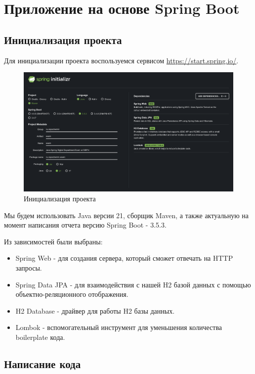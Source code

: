 \documentclass[a4paper, 14pt]{article}
\begin{document}
\newpage
\section{Приложение на основе Spring Boot}

\subsection{Инициализация проекта}

Для инициализации проекта воспользуемся сервисом \url{https://start.spring.io/}.

\begin{figure}[H]
	\centering
	\includegraphics[width=15cm]{resources/1.png}
	\caption{Инициализация проекта}
\end{figure}

Мы будем использовать Java версии 21, сборщик Maven, а также актуальную на момент написания отчета версию Spring Boot - 3.5.3.


Из зависимостей были выбраны:

\begin{itemize}
	\item Spring Web - для создания сервера, который сможет отвечать на HTTP запросы.
	\item Spring Data JPA - для взаимодействия с нашей H2 базой данных с помощью объектно-реляционного отображения.
	\item H2 Database - драйвер для работы H2 базы данных.
	\item Lombok - вспомогательный инструмент для уменьшения количества boilerplate кода.
\end{itemize}

\subsection{Написание кода}
\end{document}
